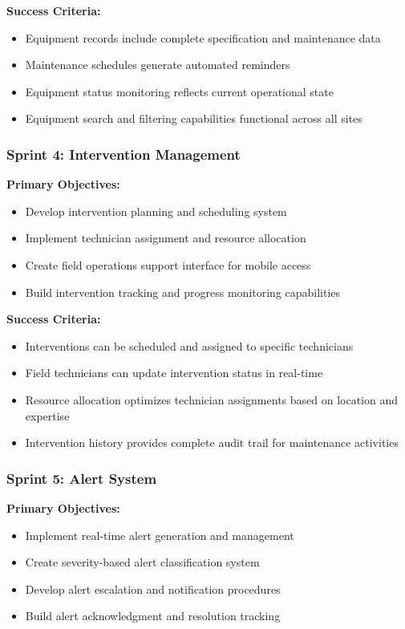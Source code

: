 \textbf{Success Criteria:}
\begin{itemize}
\item Equipment records include complete specification and maintenance data
\item Maintenance schedules generate automated reminders
\item Equipment status monitoring reflects current operational state
\item Equipment search and filtering capabilities functional across all sites
\end{itemize}

\subsubsection{Sprint 4: Intervention Management}
\textbf{Primary Objectives:}
\begin{itemize}
\item Develop intervention planning and scheduling system
\item Implement technician assignment and resource allocation
\item Create field operations support interface for mobile access
\item Build intervention tracking and progress monitoring capabilities
\end{itemize}

\textbf{Success Criteria:}
\begin{itemize}
\item Interventions can be scheduled and assigned to specific technicians
\item Field technicians can update intervention status in real-time
\item Resource allocation optimizes technician assignments based on location and expertise
\item Intervention history provides complete audit trail for maintenance activities
\end{itemize}

\subsubsection{Sprint 5: Alert System}
\textbf{Primary Objectives:}
\begin{itemize}
\item Implement real-time alert generation and management
\item Create severity-based alert classification system
\item Develop alert escalation and notification procedures
\item Build alert acknowledgment and resolution tracking
\end{itemize}

